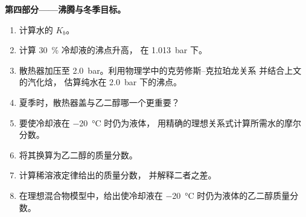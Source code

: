\begin{problem}
\medskip
\noindent\textbf{第四部分——沸腾与冬季目标。}
\begin{enumerate}[resume]
  \item 计算水的 $K_b$。
  \item 计算 \qty{30}{\percent} 冷却液的沸点升高，
        在 \qty{1.013}{bar} 下。
  \item 散热器加压至 \qty{2.0}{bar}。利用物理学中的克劳修斯–克拉珀龙关系
        并结合上文的汽化焓，
        估算纯水在
        \qty{2.0}{bar} 下的沸点。
  \item 夏季时，散热器盖与乙二醇哪一个更重要？
  \item 要使冷却液在 \qty{-20}{\celsius} 时仍为液体，
        用精确的理想关系式计算所需水的摩尔分数。
  \item 将其换算为乙二醇的质量分数。
  \item 计算稀溶液定律给出的质量分数，
        并解释二者之差。
  \item 在理想混合物模型中，给出使冷却液在
        \qty{-20}{\celsius} 时仍为液体的乙二醇质量分数。
\end{enumerate}
\end{problem}
